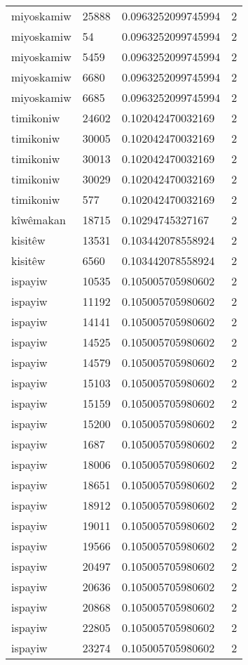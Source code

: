 \begin{longtable}{llll}
miyoskamiw & 25888 & 0.0963252099745994 & 2 \\
miyoskamiw & 54 & 0.0963252099745994 & 2 \\
miyoskamiw & 5459 & 0.0963252099745994 & 2 \\
miyoskamiw & 6680 & 0.0963252099745994 & 2 \\
miyoskamiw & 6685 & 0.0963252099745994 & 2 \\
timikoniw & 24602 & 0.102042470032169 & 2 \\
timikoniw & 30005 & 0.102042470032169 & 2 \\
timikoniw & 30013 & 0.102042470032169 & 2 \\
timikoniw & 30029 & 0.102042470032169 & 2 \\
timikoniw & 577 & 0.102042470032169 & 2 \\
kîwêmakan & 18715 & 0.10294745327167 & 2 \\
kisitêw & 13531 & 0.103442078558924 & 2 \\
kisitêw & 6560 & 0.103442078558924 & 2 \\
ispayiw & 10535 & 0.105005705980602 & 2 \\
ispayiw & 11192 & 0.105005705980602 & 2 \\
ispayiw & 14141 & 0.105005705980602 & 2 \\
ispayiw & 14525 & 0.105005705980602 & 2 \\
ispayiw & 14579 & 0.105005705980602 & 2 \\
ispayiw & 15103 & 0.105005705980602 & 2 \\
ispayiw & 15159 & 0.105005705980602 & 2 \\
ispayiw & 15200 & 0.105005705980602 & 2 \\
ispayiw & 1687 & 0.105005705980602 & 2 \\
ispayiw & 18006 & 0.105005705980602 & 2 \\
ispayiw & 18651 & 0.105005705980602 & 2 \\
ispayiw & 18912 & 0.105005705980602 & 2 \\
ispayiw & 19011 & 0.105005705980602 & 2 \\
ispayiw & 19566 & 0.105005705980602 & 2 \\
ispayiw & 20497 & 0.105005705980602 & 2 \\
ispayiw & 20636 & 0.105005705980602 & 2 \\
ispayiw & 20868 & 0.105005705980602 & 2 \\
ispayiw & 22805 & 0.105005705980602 & 2 \\
ispayiw & 23274 & 0.105005705980602 & 2 \\

\end{longtable}
